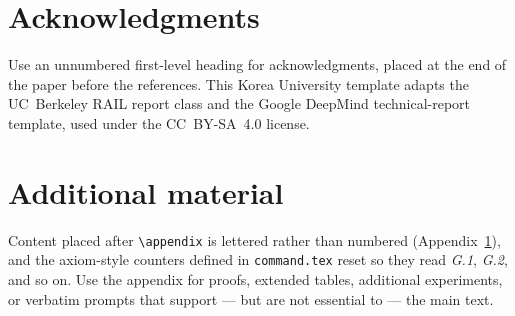 

\section*{Acknowledgments}

Use an unnumbered first-level heading for acknowledgments, placed at the end of
the paper before the references. This Korea University template adapts the UC~Berkeley RAIL
report class and the Google DeepMind technical-report template, used under the
CC~BY-SA~4.0 license.


\section{Additional material}
\label{app:extra}

Content placed after \verb+\appendix+ is lettered rather than numbered
(Appendix~\ref{app:extra}), and the axiom-style counters defined in
\verb+command.tex+ reset so they read \textit{G.1}, \textit{G.2}, and so on. Use
the appendix for proofs, extended tables, additional experiments, or verbatim
prompts that support --- but are not essential to --- the main text.


